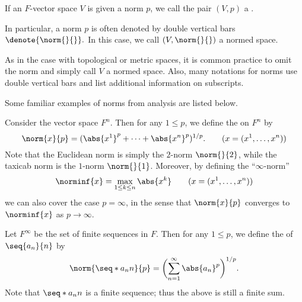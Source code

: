 \begin{definition}
    \label{def:nspace}
    If an \(F\)-vector space \(V\) is given a norm \(p\),
    we call the pair \((V,p)\) a .
    
    In particular, a norm \(p\) is often denoted by double vertical bars
    \(\denote{\norm{}{}}.\)
    In this case, we call \((V,\norm{}{})\) a normed space.
\end{definition}

As in the case with topological or metric spaces,
it is common practice to omit the norm
and simply call \(V\) a normed space.
Also, many notations for norms use double vertical bars
and list additional information on subscripts.

Some familiar examples of norms from analysis are listed below.

\begin{proposition}
    \label{prop:pnorm}
    \begin{alist}
        \item Consider the vector space \(F^n\).
        Then for any \(1\le p\),
        we define the  on \(F^n\) by
        \[
            \norm{x}{p}
            =(\abs{x^1}^p+\cdots+\abs{x^n}^p)^{1/p}.
            \qquad
            (x=(x^1,\dots,x^n))
        \]
        Note that
        the Euclidean norm is simply the \(2\)-norm \(\norm{}{2}\),
        while the taxicab norm is the \(1\)-norm \(\norm{}{1}\).
        Moreover, by defining the ``\(\infty\)-norm''
        \[
            \norminf{x}
            =\max_{1\le k\le n}\abs{x^k}
            \qquad
            (x=(x^1,\dots,x^n))
        \]
        we can also cover the case \(p=\infty\),
        in the sense that
        \(\norm{x}{p}\) converges to \(\norminf{x}\) as \(p\to\infty\).
        
        \item Let \(F^\infty\) be the set of finite sequences in \(F\).
        Then for any \(1\le p\),
        we define the  of \(\seq{a_n}{n}\) by
        \[
            \norm{\seq*{a_n}{n}}{p}
            =\biggl(\sum_{n=1}^{\infty}\abs{a_n}^p\biggr)^{1/p}.
        \]
        Note that \(\seq*{a_n}{n}\) is a finite sequence;
        thus the above is still a finite sum.
    \end{alist}
\end{proposition}

